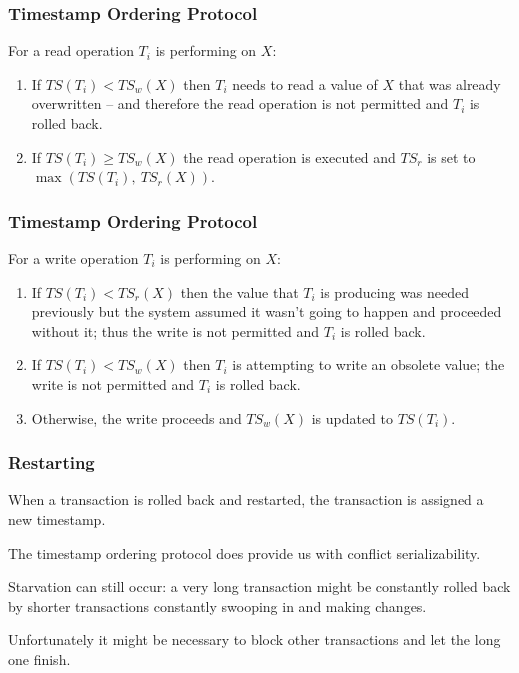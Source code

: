 \begin{frame}
\frametitle{Timestamp Ordering Protocol}

For a read operation $T_{i}$ is performing on $X$:
\begin{enumerate}
	\item If $T\!S(T_{i}) < T\!S_{w}(X)$ then $T_{i}$ needs to read a value of $X$ that was already overwritten -- and therefore the read operation is not permitted and $T_{i}$ is rolled back.
	\item If $T\!S(T_{i}) \geq T\!S_{w}(X)$ the read operation is executed and $T\!S_{r}$ is set to $\max ( T\!S(T_{i}),~T\!S_{r}(X))$.
\end{enumerate}


\end{frame}


\begin{frame}
\frametitle{Timestamp Ordering Protocol}

For a write operation $T_{i}$ is performing on $X$:
\begin{enumerate}

\item If $T\!S(T_{i}) < T\!S_{r}(X)$ then the value that $T_{i}$ is producing was needed previously but the system assumed it wasn't going to happen and proceeded without it; thus the write is not permitted and $T_{i}$ is rolled back.
\item If $T\!S(T_{i}) < T\!S_{w}(X)$ then $T_{i}$ is attempting to write an obsolete value; the write is not permitted and $T_{i}$ is rolled back.
\item Otherwise, the write proceeds and $T\!S_{w}(X)$ is updated to $T\!S(T_{i})$. 

\end{enumerate}


\end{frame}

\begin{frame}
\frametitle{Restarting}

When a transaction is rolled back and restarted, the transaction is assigned a new timestamp. 

The timestamp ordering protocol does provide us with conflict serializability.

Starvation can still occur: a very long transaction might be constantly rolled back by shorter transactions constantly swooping in and making changes.

Unfortunately it might be necessary to block other transactions and let the long one finish.


\end{frame}

